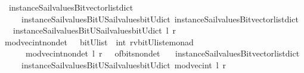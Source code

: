 \begin{isabellebody}
\ \ {\isacharparenleft}instance{\isacharunderscore}Sail{}{\isacharunderscore}values{\isacharunderscore}Bitvector{\isacharunderscore}list{\isacharunderscore}dict\isanewline
\ \ \ \ \ instance{\isacharunderscore}Sail{}{\isacharunderscore}values{\isacharunderscore}BitU{\isacharunderscore}Sail{}{\isacharunderscore}values{\isacharunderscore}bitU{\isacharunderscore}dict{\isacharparenright}\ {\isacharparenleft}instance{\isacharunderscore}Sail{}{\isacharunderscore}values{\isacharunderscore}Bitvector{\isacharunderscore}list{\isacharunderscore}dict\isanewline
\ \ \ instance{\isacharunderscore}Sail{}{\isacharunderscore}values{\isacharunderscore}BitU{\isacharunderscore}Sail{}{\isacharunderscore}values{\isacharunderscore}bitU{\isacharunderscore}dict{\isacharparenright}\ l\ r{\isacharparenright}{\isacharparenright}{\isachardoublequoteclose}\isanewline
\isanewline
{}\isamarkupfalse%
\ mod{\isacharunderscore}vec{\isacharunderscore}int{\isacharunderscore}nondet\ \ {\isacharcolon}{\isacharcolon}\ {\isachardoublequoteopen}{\isacharparenleft}bitU{\isacharparenright}list\ {\isasymRightarrow}\ int\ {\isasymRightarrow}{\isacharparenleft}{\isacharprime}rv{\isacharcomma}{\isacharparenleft}{\isacharparenleft}bitU{\isacharparenright}list{\isacharparenright}{\isacharcomma}{\isacharprime}e{\isacharparenright}monad\ {\isachardoublequoteclose}\ \ \ \isanewline
\ \ \ \ \ {\isachardoublequoteopen}\ mod{\isacharunderscore}vec{\isacharunderscore}int{\isacharunderscore}nondet\ l\ r\ {\isacharequal}\ {\isacharparenleft}\ of{\isacharunderscore}bits{\isacharunderscore}nondet\ \isanewline
\ \ {\isacharparenleft}instance{\isacharunderscore}Sail{}{\isacharunderscore}values{\isacharunderscore}Bitvector{\isacharunderscore}list{\isacharunderscore}dict\isanewline
\ \ \ \ \ instance{\isacharunderscore}Sail{}{\isacharunderscore}values{\isacharunderscore}BitU{\isacharunderscore}Sail{}{\isacharunderscore}values{\isacharunderscore}bitU{\isacharunderscore}dict{\isacharparenright}\ {\isacharparenleft}mod{\isacharunderscore}vec{\isacharunderscore}int\ l\ r{\isacharparenright}{\isacharparenright}{\isachardoublequoteclose}\isanewline
\isanewline
\isanewline
%
\isanewline
%
\end{isabellebody}
